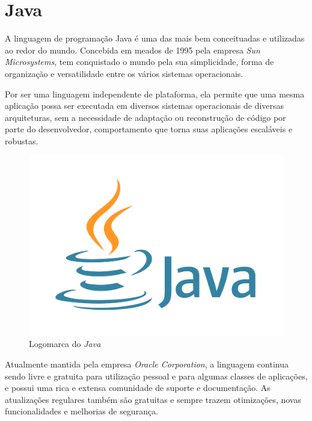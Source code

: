 \documentclass[
	12pt,			%
	openright,		%
	oneside,	
	a4paper,		%
	english,		%
	brazil			%
]{abntex2/abntex2}  %
\begin{document}
	\section{Java}
	
	A linguagem de programação Java \cite{java} é uma das mais bem conceituadas e utilizadas ao redor do mundo. Concebida em meados de 1995 pela empresa \textit{Sun Microsystems}, tem conquistado o mundo pela sua simplicidade, forma de organização e versatilidade entre os vários sistemas operacionais.
	
	Por ser uma linguagem independente de plataforma, ela permite que uma mesma aplicação possa ser executada em diversos sistemas operacionais de diversas arquiteturas, sem a necessidade de adaptação ou reconstrução de código por parte do desenvolvedor, comportamento que torna suas aplicações escaláveis e robustas.
	
	\begin{figure}[H]
		
		\caption{\label{java-logo}Logomarca do \textit{Java}}
		\begin{center}
			\includegraphics[scale=0.04]{img/java-logo}
		\end{center}
		
	\end{figure}
	
	Atualmente mantida pela empresa \textit{Oracle Corporation}, a linguagem continua sendo livre e gratuita para utilização pessoal e para algumas classes de aplicações, e possui uma rica e extensa comunidade de suporte e documentação. As atualizações regulares também são gratuitas e sempre trazem otimizações, novas funcionalidades e melhorias de segurança.
\end{document}
